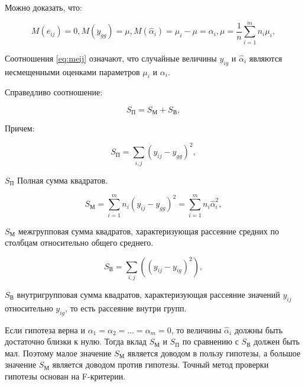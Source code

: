 Можно доказать, что:

\begin{equation}
\label{eq:meij}
M(e_{ij})=0,M(y_{gg})=\mu,M(\widehat{\alpha}_i)=\mu_i-\mu=\alpha_i, \mu=\frac{1}{n}\sum_{i=1}^{m}{n_i\mu_i},
\end{equation}

Соотношения \eqref{eq:meij} означают, что случайные величины $y_{ig}$ и $\widehat{\alpha}_i$ являются несмещенными оценками параметров $\mu_i$ и $\alpha_i$.

Справедливо соотношение:

\begin{equation}
\label{eq:spsum}
S_П=S_М+S_В,
\end{equation}

Причем:

\begin{equation}
\label{eq:sp}
S_П=\sum_{i,j}{\left(y_{ij}-y_{gg}\right)^2},
\end{equation}
\begin{eqexpl}[15mm]
\item{$S_П$} Полная сумма квадратов.
\end{eqexpl}

\begin{equation}
\label{eq:sp}
S_М=\sum_{i=1}^{m}{n_i\left(y_{ij}-y_{gg}\right)^2=\sum_{i=1}^{m}{n_i\widehat{\alpha}_i^2}},
\end{equation}
\begin{eqexpl}[15mm]
\item{$S_М$} межгрупповая сумма квадратов, характеризующая рассеяние средних по столбцам относительно общего среднего.
\end{eqexpl}

\begin{equation}
\label{eq:sv}
S_В=\sum_{i,j}{\left(\left(y_{ij}-y_{ig}\right)^2\right)},
\end{equation}
\begin{eqexpl}[15mm]
\item{$S_В$} внутригрупповая сумма квадратов, характеризующая рассеяние значений $y_{ij}$ относительно $y_{ig}$, то есть рассеяние внутри групп.
\end{eqexpl}

Если гипотеза верна и $\alpha_1=\alpha_2=...=\alpha_m=0$, то величины $\widehat{\alpha}_i$ должны быть достаточно близки к нулю. Тогда вклад $S_М$ и $S_П$ по сравнению с $S_В$ должен быть мал. Поэтому малое значение $S_М$ является доводом в пользу гипотезы, а большое значение $S_М$ является доводом против гипотезы. Точный метод проверки гипотезы основан на F-критерии. \cite{disperMethod}

